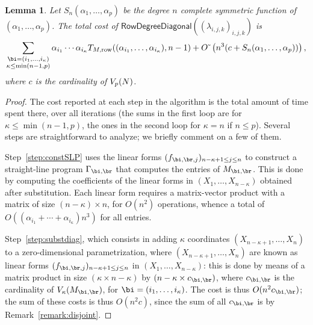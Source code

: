 \documentclass[12pt]{article}
\newtheorem{lemma}[definition]{Lemma}
\begin{document}
\begin{lemma}\label{lemma:rowdegreediagonal}
  Let $S_n(\alpha_1,\dots,\alpha_p)$ be the degree $n$ complete
  symmetric function of $(\alpha_1,\dots,\alpha_p)$.  The total cost of
  $\mathsf{RowDegreeDiagonal}((\lambda_{i,j,k})_{i,j,k})$
  is $$\sum_{\substack{\bi=(i_1,\dots,i_\kappa)\\ \kappa\le\min(n-1,p)}}
  \alpha_{i_1} \cdots \alpha_{i_\kappa} T_{M,{\rm
      row}}((\alpha_{i_1},\dots,\alpha_{i_\kappa}), n-1) + \softO\left (n^3(c + S_n(\alpha_1,\dots,\alpha_p))  \right),$$
  where $c$ is the cardinality of $V_p({N})$.
\end{lemma}
\begin{proof}
  The cost reported at each step in the algorithm is the total amount
  of time spent there, over all iterations (the sums in the first loop
  are for $\kappa \le \min(n-1,p)$, the ones in the second loop for
  $\kappa=n$ if $n \le p$). Several steps are straightforward to
  analyze; we briefly comment on a few of them.

  Step~\ref{step:constSLP} uses the linear forms
  $(f_{\bi,\br,j})_{n-\kappa+1 \le j \le n}$ to construct a
  straight-line program $\Gamma_{\bi,\br}$ that computes the entries
  of $\mM_{\bi,\br}$. This is done by computing the coefficients
  of the linear forms in $(X_1,\dots,X_{n-\kappa})$ obtained after 
  substitution. Each linear form requires a matrix-vector product 
  with a matrix of size $(n-\kappa) \times n$, for $O(n^2)$ operations,
  whence a total of $O((\alpha_{i_1} + \cdots +\alpha_{i_\kappa})n^3)$
  for all entries.

  Step~\ref{step:substdiag}, which consists in adding $\kappa$
  coordinates $(X_{n-\kappa+1},\dots,X_n)$ to a zero-dimensional
  parametrization, where $(X_{n-\kappa+1},\dots,X_n)$ are known as
  linear forms $(f_{\bi,\br,j})_{n-\kappa+1 \le j \le n}$ in $(X_1,
  \ldots, X_{n-\kappa})$: this is done by means of a matrix product in
  size $(\kappa \times n-\kappa)$ by $(n-\kappa \times c_{\bi,\br})$,
  where $c_{\bi,\br}$ is the cardinality of $V_\kappa(\mM_{\bi,\br})$,
  for $\bi=(i_1,\dots,i_\kappa)$.  The cost is thus $O(n^2
  c_{\bi,\br})$; the sum of these costs is thus $O(n^2 c)$, since the
  sum of all $c_{\bi,\br}$ is by Remark~\ref{remark:disjoint}.


\end{proof}
\end{document}

